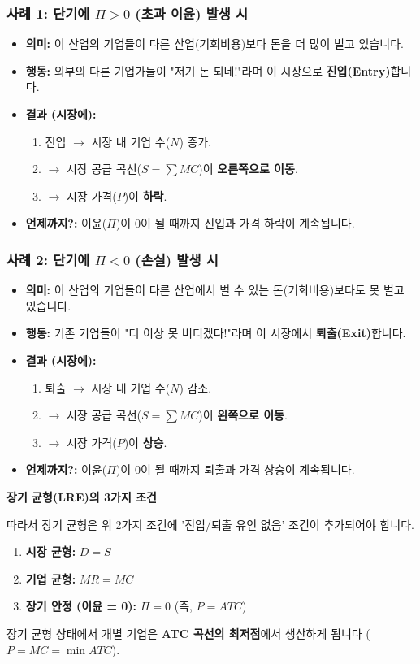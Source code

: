 \documentclass[11pt,a4paper]{article}
\theoremstyle{definition}
\begin{document}
\subsubsection{사례 1: 단기에 $\Pi > 0$ (초과 이윤) 발생 시}
\begin{itemize}
    \item \textbf{의미:} 이 산업의 기업들이 다른 산업(기회비용)보다 돈을 더 많이 벌고 있습니다.
    \item \textbf{행동:} 외부의 다른 기업가들이 "저기 돈 되네!"라며 이 시장으로 \textbf{진입(Entry)}합니다.
    \item \textbf{결과 (시장에):}
    \begin{enumerate}
        \item 진입 $\to$ 시장 내 기업 수($N$) 증가.
        \item $\to$ 시장 공급 곡선($S = \sum MC$)이 \textbf{오른쪽으로 이동}.
        \item $\to$ 시장 가격($P$)이 \textbf{하락}.
    \end{enumerate}
    \item \textbf{언제까지?:} 이윤($\Pi$)이 0이 될 때까지 진입과 가격 하락이 계속됩니다.
\end{itemize}

\subsubsection{사례 2: 단기에 $\Pi < 0$ (손실) 발생 시}
\begin{itemize}
    \item \textbf{의미:} 이 산업의 기업들이 다른 산업에서 벌 수 있는 돈(기회비용)보다도 못 벌고 있습니다.
    \item \textbf{행동:} 기존 기업들이 "더 이상 못 버티겠다!"라며 이 시장에서 \textbf{퇴출(Exit)}합니다.
    \item \textbf{결과 (시장에):}
    \begin{enumerate}
        \item 퇴출 $\to$ 시장 내 기업 수($N$) 감소.
        \item $\to$ 시장 공급 곡선($S = \sum MC$)이 \textbf{왼쪽으로 이동}.
        \item $\to$ 시장 가격($P$)이 \textbf{상승}.
    \end{enumerate}
    \item \textbf{언제까지?:} 이윤($\Pi$)이 0이 될 때까지 퇴출과 가격 상승이 계속됩니다.
\end{itemize}

\begin{summarybox}
\textbf{장기 균형(LRE)의 3가지 조건}

따라서 장기 균형은 위 2가지 조건에 '진입/퇴출 유인 없음' 조건이 추가되어야 합니다.
\begin{enumerate}
    \item \textbf{시장 균형:} $D = S$
    \item \textbf{기업 균형:} $MR = MC$
    \item \textbf{장기 안정 (이윤 = 0):} $\Pi = 0$ (즉, $P = ATC$)
\end{enumerate}
장기 균형 상태에서 개별 기업은 \textbf{ATC 곡선의 최저점}에서 생산하게 됩니다 ($P = MC = \min ATC$).
\end{summarybox}
\end{document}
